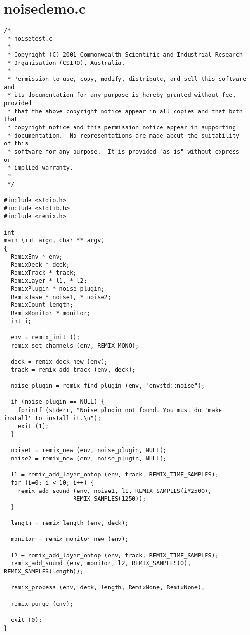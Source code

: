\section{noisedemo.c}


\footnotesize\begin{verbatim}/*
 * noisetest.c
 *
 * Copyright (C) 2001 Commonwealth Scientific and Industrial Research
 * Organisation (CSIRO), Australia.
 *
 * Permission to use, copy, modify, distribute, and sell this software and
 * its documentation for any purpose is hereby granted without fee, provided
 * that the above copyright notice appear in all copies and that both that
 * copyright notice and this permission notice appear in supporting
 * documentation.  No representations are made about the suitability of this
 * software for any purpose.  It is provided "as is" without express or
 * implied warranty.
 *
 */

#include <stdio.h>
#include <stdlib.h>
#include <remix.h>

int
main (int argc, char ** argv)
{
  RemixEnv * env;
  RemixDeck * deck;
  RemixTrack * track;
  RemixLayer * l1, * l2;
  RemixPlugin * noise_plugin;
  RemixBase * noise1, * noise2;
  RemixCount length;
  RemixMonitor * monitor;
  int i;

  env = remix_init ();
  remix_set_channels (env, REMIX_MONO);

  deck = remix_deck_new (env);
  track = remix_add_track (env, deck);

  noise_plugin = remix_find_plugin (env, "envstd::noise");

  if (noise_plugin == NULL) {
    fprintf (stderr, "Noise plugin not found. You must do 'make install' to install it.\n");
    exit (1);
  }

  noise1 = remix_new (env, noise_plugin, NULL);
  noise2 = remix_new (env, noise_plugin, NULL);

  l1 = remix_add_layer_ontop (env, track, REMIX_TIME_SAMPLES);
  for (i=0; i < 10; i++) {
    remix_add_sound (env, noise1, l1, REMIX_SAMPLES(i*2500),
                    REMIX_SAMPLES(1250));
  }

  length = remix_length (env, deck);

  monitor = remix_monitor_new (env);

  l2 = remix_add_layer_ontop (env, track, REMIX_TIME_SAMPLES);
  remix_add_sound (env, monitor, l2, REMIX_SAMPLES(0), REMIX_SAMPLES(length));

  remix_process (env, deck, length, RemixNone, RemixNone);

  remix_purge (env);

  exit (0);
}
\end{verbatim}\normalsize
 
